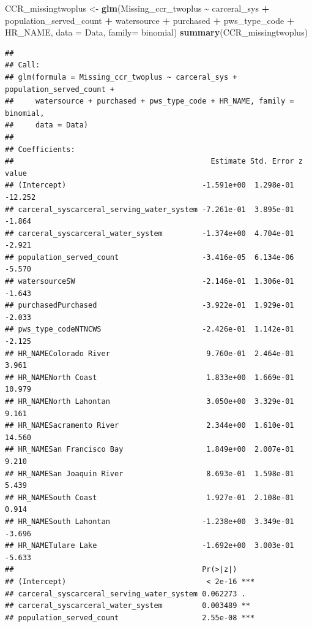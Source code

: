 \documentclass[
]{article}
\newenvironment{Shaded}{\begin{snugshade}}{\end{snugshade}}
\newcommand{\AttributeTok}[1]{\textcolor[rgb]{0.13,0.29,0.53}{#1}}
\newcommand{\FunctionTok}[1]{\textcolor[rgb]{0.13,0.29,0.53}{\textbf{#1}}}
\newcommand{\NormalTok}[1]{#1}
\newcommand{\OtherTok}[1]{\textcolor[rgb]{0.56,0.35,0.01}{#1}}
\newcommand{\SpecialCharTok}[1]{\textcolor[rgb]{0.81,0.36,0.00}{\textbf{#1}}}
\begin{document}
\begin{Shaded}
\begin{Highlighting}[]
\NormalTok{CCR\_missingtwoplus }\OtherTok{\textless{}{-}} \FunctionTok{glm}\NormalTok{(Missing\_ccr\_twoplus }\SpecialCharTok{\textasciitilde{}}\NormalTok{ carceral\_sys }\SpecialCharTok{+}\NormalTok{ population\_served\_count }\SpecialCharTok{+}\NormalTok{ watersource }\SpecialCharTok{+}\NormalTok{ purchased }\SpecialCharTok{+}\NormalTok{ pws\_type\_code }\SpecialCharTok{+}\NormalTok{ HR\_NAME, }\AttributeTok{data =}\NormalTok{ Data, }\AttributeTok{family=}\NormalTok{ binomial)}
\FunctionTok{summary}\NormalTok{(CCR\_missingtwoplus)}
\end{Highlighting}
\end{Shaded}

\begin{verbatim}
## 
## Call:
## glm(formula = Missing_ccr_twoplus ~ carceral_sys + population_served_count + 
##     watersource + purchased + pws_type_code + HR_NAME, family = binomial, 
##     data = Data)
## 
## Coefficients:
##                                             Estimate Std. Error z value
## (Intercept)                               -1.591e+00  1.298e-01 -12.252
## carceral_syscarceral_serving_water_system -7.261e-01  3.895e-01  -1.864
## carceral_syscarceral_water_system         -1.374e+00  4.704e-01  -2.921
## population_served_count                   -3.416e-05  6.134e-06  -5.570
## watersourceSW                             -2.146e-01  1.306e-01  -1.643
## purchasedPurchased                        -3.922e-01  1.929e-01  -2.033
## pws_type_codeNTNCWS                       -2.426e-01  1.142e-01  -2.125
## HR_NAMEColorado River                      9.760e-01  2.464e-01   3.961
## HR_NAMENorth Coast                         1.833e+00  1.669e-01  10.979
## HR_NAMENorth Lahontan                      3.050e+00  3.329e-01   9.161
## HR_NAMESacramento River                    2.344e+00  1.610e-01  14.560
## HR_NAMESan Francisco Bay                   1.849e+00  2.007e-01   9.210
## HR_NAMESan Joaquin River                   8.693e-01  1.598e-01   5.439
## HR_NAMESouth Coast                         1.927e-01  2.108e-01   0.914
## HR_NAMESouth Lahontan                     -1.238e+00  3.349e-01  -3.696
## HR_NAMETulare Lake                        -1.692e+00  3.003e-01  -5.633
##                                           Pr(>|z|)    
## (Intercept)                                < 2e-16 ***
## carceral_syscarceral_serving_water_system 0.062273 .  
## carceral_syscarceral_water_system         0.003489 ** 
## population_served_count                   2.55e-08 ***

\end{verbatim}
\end{document}

